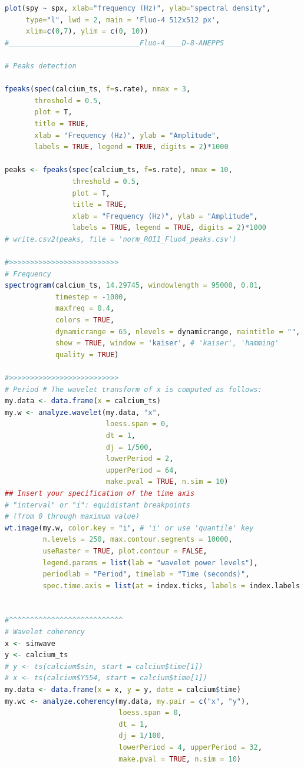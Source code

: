 \documentclass{biophys-new}
\begin{document}
\begin{lstlisting}[language=R]
plot(spy ~ spx, xlab="frequency (Hz)", ylab="spectral density",
     type="l", lwd = 2, main = 'Fluo-4 512x512 px',
     xlim=c(0,7), ylim = c(0, 10))
#_______________________________Fluo-4____D-8-ANEPPS

# Peaks detection

fpeaks(spec(calcium_ts, f=s.rate), nmax = 3,
       threshold = 0.5,
       plot = T,
       title = TRUE,
       xlab = "Frequency (Hz)", ylab = "Amplitude",
       labels = TRUE, legend = TRUE, digits = 2)*1000

peaks <- fpeaks(spec(calcium_ts, f=s.rate), nmax = 10,
                threshold = 0.5,
                plot = T,
                title = TRUE,
                xlab = "Frequency (Hz)", ylab = "Amplitude",
                labels = TRUE, legend = TRUE, digits = 2)*1000
# write.csv2(peaks, file = 'norm_ROI1_Fluo4_peaks.csv')

#>>>>>>>>>>>>>>>>>>>>>>>>>>
# Frequency
spectrogram(calcium_ts, 14.29745, windowlength = 95000, 0.01,
            timestep = -1000,
            maxfreq = 0.4,
            colors = TRUE,
            dynamicrange = 65, nlevels = dynamicrange, maintitle = "",
            show = TRUE, window = 'kaiser', # 'kaiser', 'hamming'
            quality = TRUE)

#>>>>>>>>>>>>>>>>>>>>>>>>>>
# Period # The wavelet transform of x is computed as follows:
my.data <- data.frame(x = calcium_ts)
my.w <- analyze.wavelet(my.data, "x",
                        loess.span = 0,
                        dt = 1,
                        dj = 1/500,
                        lowerPeriod = 2,
                        upperPeriod = 64,
                        make.pval = TRUE, n.sim = 10)
## Insert your specification of the time axis
# "interval" or "i": equidistant breakpoints
# (from 0 through maximum value)
wt.image(my.w, color.key = "i", # 'i' or use 'quantile' key
         n.levels = 250, max.contour.segments = 10000,
         useRaster = TRUE, plot.contour = FALSE,
         legend.params = list(lab = "wavelet power levels"),
         periodlab = "Period", timelab = "Time (seconds)",
         spec.time.axis = list(at = index.ticks, labels = index.labels.rounded))


#^^^^^^^^^^^^^^^^^^^^^^^^^^^
# Wavelet coherency
x <- sinwave
y <- calcium_ts
# y <- ts(calcium$sin, start = calcium$time[1])
# x <- ts(calcium$Y554, start = calcium$time[1])
my.data <- data.frame(x = x, y = y, date = calcium$time)
my.wc <- analyze.coherency(my.data, my.pair = c("x", "y"),
                           loess.span = 0,
                           dt = 1,
                           dj = 1/100,
                           lowerPeriod = 4, upperPeriod = 32,
                           make.pval = TRUE, n.sim = 10)


\end{lstlisting}
\end{document}
